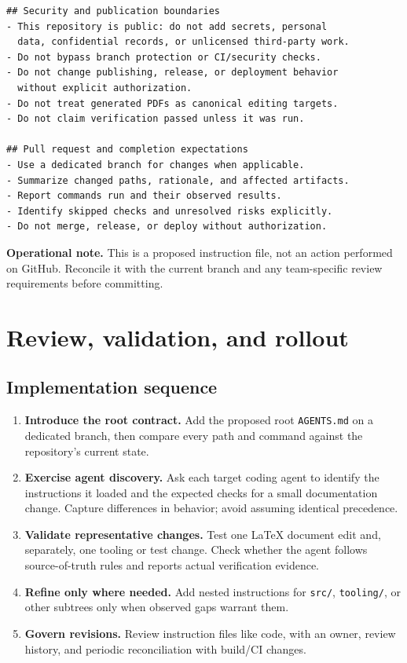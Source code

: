 \documentclass[11pt,letterpaper]{article}
\begin{document}
\begin{lstlisting}
## Security and publication boundaries
- This repository is public: do not add secrets, personal
  data, confidential records, or unlicensed third-party work.
- Do not bypass branch protection or CI/security checks.
- Do not change publishing, release, or deployment behavior
  without explicit authorization.
- Do not treat generated PDFs as canonical editing targets.
- Do not claim verification passed unless it was run.

## Pull request and completion expectations
- Use a dedicated branch for changes when applicable.
- Summarize changed paths, rationale, and affected artifacts.
- Report commands run and their observed results.
- Identify skipped checks and unresolved risks explicitly.
- Do not merge, release, or deploy without authorization.
\end{lstlisting}

\begin{neutralbox}
\textbf{Operational note.} This is a proposed instruction file, not an action performed on GitHub. Reconcile it with the current branch and any team-specific review requirements before committing.
\end{neutralbox}

\section{Review, validation, and rollout}

\subsection{Implementation sequence}
\begin{enumerate}[label=\textbf{Phase \arabic*:},leftmargin=2.1cm]
\item \textbf{Introduce the root contract.} Add the proposed root \texttt{AGENTS.md} on a dedicated branch, then compare every path and command against the repository's current state.
\item \textbf{Exercise agent discovery.} Ask each target coding agent to identify the instructions it loaded and the expected checks for a small documentation change. Capture differences in behavior; avoid assuming identical precedence.
\item \textbf{Validate representative changes.} Test one LaTeX document edit and, separately, one tooling or test change. Check whether the agent follows source-of-truth rules and reports actual verification evidence.
\item \textbf{Refine only where needed.} Add nested instructions for \texttt{src/}, \texttt{tooling/}, or other subtrees only when observed gaps warrant them.
\item \textbf{Govern revisions.} Review instruction files like code, with an owner, review history, and periodic reconciliation with build/CI changes.
\end{enumerate}
\end{document}
